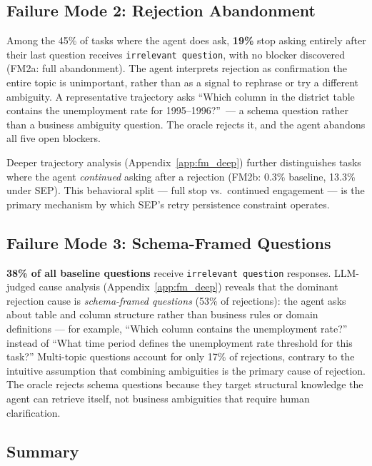 \documentclass{article} %
\newcommand{\oursystem}{SEP} %
\begin{document}
\subsection{Failure Mode 2: Rejection Abandonment}

Among the 45\% of tasks where the agent does ask, \textbf{19\%} stop asking entirely
after their last question receives \texttt{irrelevant question}, with no blocker
discovered (FM2a: full abandonment).
The agent interprets rejection as confirmation the entire topic is unimportant, rather
than as a signal to rephrase or try a different ambiguity.
A representative trajectory asks ``Which column in the district table contains the
unemployment rate for 1995--1996?''\ --- a schema question rather than a business
ambiguity question. The oracle rejects it, and the agent abandons all five open blockers.

Deeper trajectory analysis (Appendix~\ref{app:fm_deep}) further distinguishes tasks
where the agent \emph{continued} asking after a rejection (FM2b: 0.3\% baseline,
13.3\% under \oursystem{}).
This behavioral split --- full stop vs.\ continued engagement --- is the primary
mechanism by which \oursystem{}'s retry persistence constraint operates.

\subsection{Failure Mode 3: Schema-Framed Questions}

\textbf{38\% of all baseline questions} receive \texttt{irrelevant question} responses.
LLM-judged cause analysis (Appendix~\ref{app:fm_deep}) reveals that the dominant
rejection cause is \emph{schema-framed questions} (53\% of rejections): the agent asks
about table and column structure rather than business rules or domain definitions ---
for example, ``Which column contains the unemployment rate?'' instead of ``What time
period defines the unemployment rate threshold for this task?''
Multi-topic questions account for only 17\% of rejections, contrary to the intuitive
assumption that combining ambiguities is the primary cause of rejection.
The oracle rejects schema questions because they target structural knowledge the agent
can retrieve itself, not business ambiguities that require human clarification.

\subsection{Summary}
\end{document}
